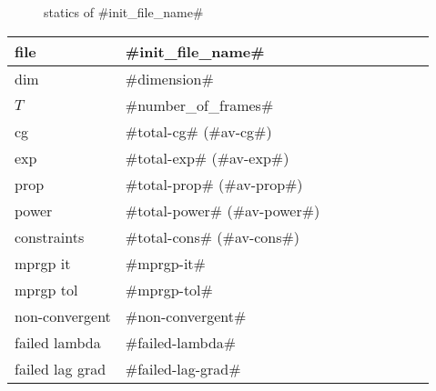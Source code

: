 \begin{figure}
  \centering
  \caption{statics of #init_file_name#}
  \label{en_f}
\end{figure}

\begin{center}
  \begin{tabular}{|l*{8}{|l}}
    \hline
	file & #init_file_name# \\ \hline
	dim & #dimension# \\ \hline
	$T$ & #number_of_frames# \\ \hline
	cg & #total-cg# (#av-cg#) \\ \hline
	exp & #total-exp# (#av-exp#) \\ \hline
	prop & #total-prop# (#av-prop#) \\ \hline
	power & #total-power# (#av-power#) \\ \hline
    constraints & #total-cons# (#av-cons#) \\ \hline
    mprgp it & #mprgp-it# \\ \hline
	mprgp tol & #mprgp-tol# \\ \hline
    non-convergent & #non-convergent# \\ \hline
    failed lambda & #failed-lambda# \\ \hline
    failed lag grad & #failed-lag-grad# \\ \hline
  \end{tabular}
\end{center}

